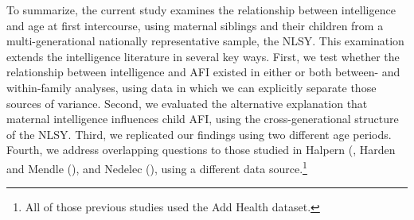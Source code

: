 To summarize, the current study examines the relationship between intelligence and age at first intercourse, using maternal siblings and their children from a multi-generational nationally representative sample, the NLSY. This examination extends the intelligence literature in several key ways. First, we test whether the relationship between intelligence and AFI existed in either or both between- and within-family analyses, using data in which we can explicitly separate those sources of variance. Second, we evaluated the alternative explanation that maternal intelligence influences child AFI, using the cross-generational structure of the NLSY. Third, we replicated our findings using two different age periods. Fourth, we address overlapping questions to those studied in Halpern \et (\citeyear{halpern2000smart}, Harden and Mendle (\citeyear{harden2011don}), and Nedelec \et (\citeyear{nedelec2012exploring}), using a different data source.\footnote{All of those previous studies used the Add Health dataset.}

